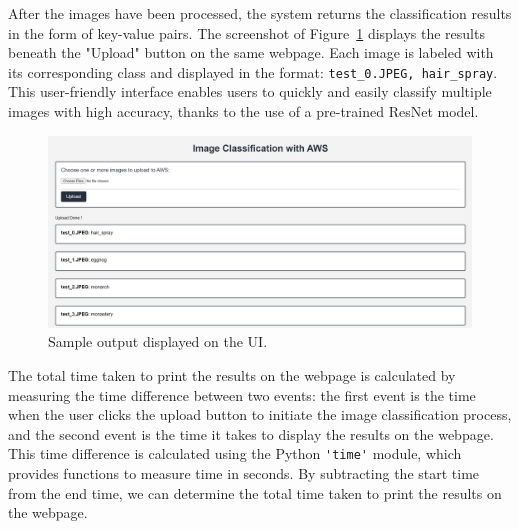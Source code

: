 \documentclass[../main.tex]{subfiles}
\begin{document}
After the images have been processed, the system returns the classification results in the form of key-value pairs. The screenshot of Figure~\ref{fig:op} displays the results beneath the "Upload" button on the same webpage. Each image is labeled with its corresponding class and displayed in the format: \verb|test_0.JPEG, hair_spray|. This user-friendly interface enables users to quickly and easily classify multiple images with high accuracy, thanks to the use of a pre-trained ResNet model.
\begin{figure}[h!]
\centering
\includegraphics[scale=0.36]{images/output.png}
\caption{Sample output displayed on the UI.}
\label{fig:op}
\end{figure}

The total time taken to print the results on the webpage is calculated by measuring the time difference between two events: the first event is the time when the user clicks the upload button to initiate the image classification process, and the second event is the time it takes to display the results on the webpage. This time difference is calculated using the Python \verb|'time'| module, which provides functions to measure time in seconds. By subtracting the start time from the end time, we can determine the total time taken to print the results on the webpage.
\end{document}
